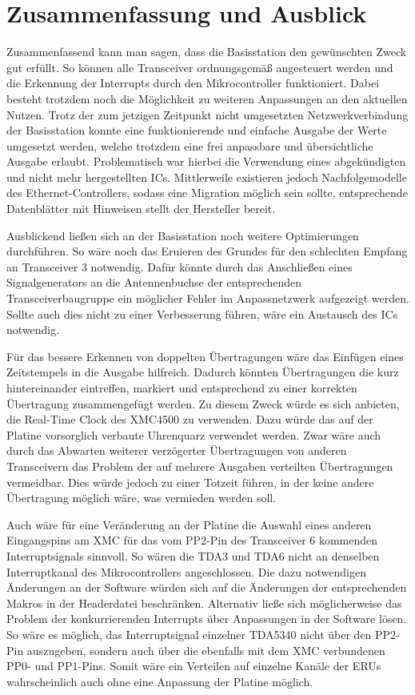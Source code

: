 \chapter{Zusammenfassung und Ausblick}
\label{sec:Zusammenfassung}
\pagestyle{scrheadings}
Zusammenfassend kann man sagen, dass die Basisstation den gewünschten Zweck gut erfüllt. So können alle Transceiver ordnungsgemäß angesteuert werden und die Erkennung der Interrupts durch den Mikrocontroller funktioniert. Dabei besteht trotzdem noch die Möglichkeit zu weiteren Anpassungen an den aktuellen Nutzen.  Trotz der zum jetzigen Zeitpunkt nicht umgesetzten Netzwerkverbindung der Basisstation konnte eine funktionierende und einfache Ausgabe der Werte umgesetzt werden, welche trotzdem eine frei anpassbare und übersichtliche Ausgabe erlaubt. Problematisch war hierbei die Verwendung eines abgekündigten und nicht mehr hergestellten \acp{IC}. Mittlerweile existieren jedoch Nachfolgemodelle des Ethernet-Controllers, sodass eine Migration möglich sein sollte, entsprechende Datenblätter mit Hinweisen stellt der Hersteller bereit. 





Ausblickend ließen sich an der Basisstation noch weitere Optimierungen durchführen.
So wäre noch das Eruieren des Grundes für den schlechten Empfang an Transceiver $3$ notwendig. Dafür könnte durch das Anschließen eines Signalgenerators an die Antennenbuchse der entsprechenden Transceiverbaugruppe ein möglicher Fehler im Anpassnetzwerk aufgezeigt werden. Sollte auch dies nicht zu einer Verbesserung führen, wäre ein Austausch des \acp{IC} notwendig.

Für das bessere Erkennen von doppelten Übertragungen wäre das Einfügen eines Zeitstempels in die Ausgabe hilfreich. Dadurch könnten Übertragungen die kurz hintereinander eintreffen, markiert und entsprechend zu einer korrekten Übertragung zusammengefügt werden. Zu diesem Zweck würde es sich anbieten, die Real-Time Clock des XMC4500 zu verwenden. Dazu würde das auf der Platine vorsorglich verbaute Uhrenquarz verwendet werden. Zwar wäre auch durch das Abwarten weiterer verzögerter Übertragungen von anderen Transceivern das Problem der auf mehrere Ausgaben verteilten Übertragungen vermeidbar. Dies würde jedoch zu einer Totzeit führen, in der keine andere Übertragung möglich wäre, was vermieden werden soll.

Auch wäre für eine Veränderung an der Platine die Auswahl eines anderen Eingangspins am XMC für das vom PP2-Pin des Transceiver 6 kommenden Interruptsignals sinnvoll. So wären die TDA3 und TDA6 nicht an denselben Interruptkanal des Mikrocontrollers angeschlossen. Die dazu notwendigen Änderungen an der Software würden sich auf die Änderungen der entsprechenden Makros in der Headerdatei beschränken.
Alternativ ließe sich möglicherweise das Problem der konkurrierenden Interrupts über Anpassungen in der Software lösen. So wäre es möglich, das Interruptsignal einzelner TDA5340 nicht über den PP2-Pin auszugeben, sondern auch über die ebenfalls mit dem XMC verbundenen PP0- und PP1-Pins. Somit wäre ein Verteilen auf einzelne Kanäle der \acp{ERU} wahrscheinlich auch ohne eine Anpassung der Platine möglich.


